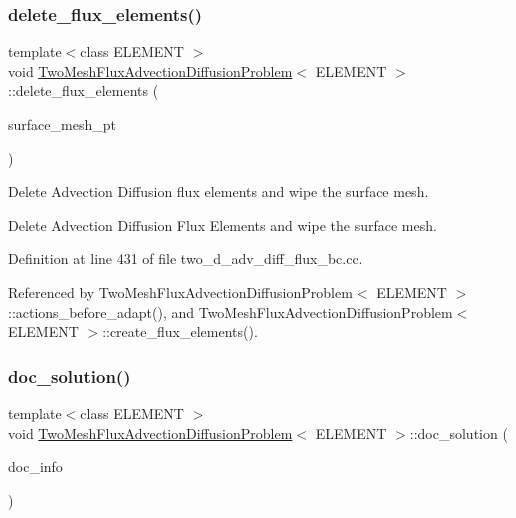 \mbox{\label{classTwoMeshFluxAdvectionDiffusionProblem_ac478c7d0dc6e94cbe007287d5af69a28}} 
\subsubsection{\texorpdfstring{delete\+\_\+flux\+\_\+elements()}{delete\_flux\_elements()}}
{\footnotesize\ttfamily template$<$class E\+L\+E\+M\+E\+NT $>$ \\
void \hyperlink{classTwoMeshFluxAdvectionDiffusionProblem}{Two\+Mesh\+Flux\+Advection\+Diffusion\+Problem}$<$ E\+L\+E\+M\+E\+NT $>$\+::delete\+\_\+flux\+\_\+elements (\begin{DoxyParamCaption}\item[{Mesh $\ast$const \&}]{surface\+\_\+mesh\+\_\+pt }\end{DoxyParamCaption})\hspace{0.3cm}{\ttfamily [private]}}



Delete Advection Diffusion flux elements and wipe the surface mesh. 

Delete Advection Diffusion Flux Elements and wipe the surface mesh. 

Definition at line 431 of file two\+\_\+d\+\_\+adv\+\_\+diff\+\_\+flux\+\_\+bc.\+cc.



Referenced by Two\+Mesh\+Flux\+Advection\+Diffusion\+Problem$<$ E\+L\+E\+M\+E\+N\+T $>$\+::actions\+\_\+before\+\_\+adapt(), and Two\+Mesh\+Flux\+Advection\+Diffusion\+Problem$<$ E\+L\+E\+M\+E\+N\+T $>$\+::create\+\_\+flux\+\_\+elements().

\mbox{\label{classTwoMeshFluxAdvectionDiffusionProblem_a53cc08148cdf2f548939b5d09236f023}} 
\subsubsection{\texorpdfstring{doc\+\_\+solution()}{doc\_solution()}}
{\footnotesize\ttfamily template$<$class E\+L\+E\+M\+E\+NT $>$ \\
void \hyperlink{classTwoMeshFluxAdvectionDiffusionProblem}{Two\+Mesh\+Flux\+Advection\+Diffusion\+Problem}$<$ E\+L\+E\+M\+E\+NT $>$\+::doc\+\_\+solution (\begin{DoxyParamCaption}\item[{Doc\+Info \&}]{doc\+\_\+info }\end{DoxyParamCaption})}



